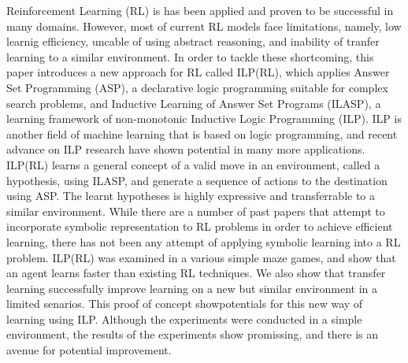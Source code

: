 Reinforcement Learning (RL) is has been applied and proven to be successful in many domains.
However, most of current RL models face limitations, namely, low learnig efficiency, uncable of using abstract reasoning, and inability of tranfer learning to a similar environment.
In order to tackle these shortcoming, this paper introduces a new approach for RL called ILP(RL), 
which applies Answer Set Programming (ASP), a declarative logic programming suitable for complex search problems, 
and Inductive Learning of Answer Set Programs (ILASP), a learning framework of non-monotonic Inductive Logic Programming (ILP).
ILP is another field of machine learning that is based on logic programming, and recent advance on ILP research have shown potential in many more applications.
ILP(RL) learns a general concept of a valid move in an environment, called a hypothesis, using ILASP, and generate a sequence of actions to the destination using ASP.
The learnt hypotheses is highly expressive and transferrable to a similar environment. 
While there are a number of past papers that attempt to incorporate symbolic representation to RL problems in order to achieve efficient learning, 
there has not been any attempt of applying symbolic learning into a RL problem.
ILP(RL) was examined in a various simple maze games, and show that an agent learns faster than existing RL techniques.
We also show that transfer learning successfully improve learning on a new but similar environment in a limited senarios.
This proof of concept showpotentials for this new way of learning using ILP.
Although the experiments were conducted in a simple environment, the results of the experiments show promissing, and there is an avenue for potential improvement.
